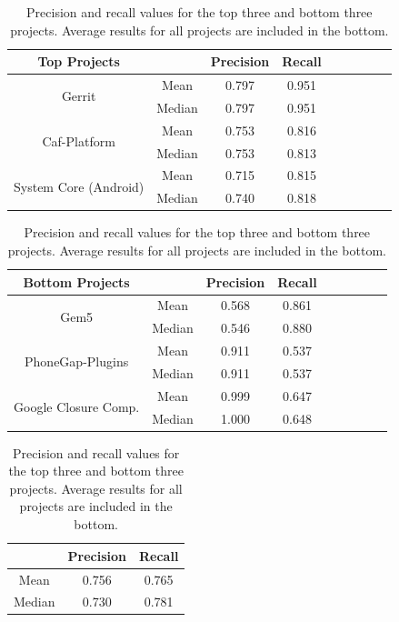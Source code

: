 \documentclass{sig-alternate-05-2015}
\begin{document}
\begin{table}
\centering
\caption{Precision and recall values for the top three and bottom three projects. Average results for all projects are included in the bottom.}
\label{tab:regression}
\begin{tabular}{|c|c|c|c|c|c|c|c|c|} \hline
\textbf{Top Projects}&&\textbf{Precision}&\textbf{Recall}\\ \hline

\multirow{2}{*}{Gerrit}&Mean&0.797&0.951\\ \cline{2-4}
&Median&0.797&0.951\\ \hline
\multirow{2}{*}{Caf-Platform}&Mean&0.753&0.816\\ \cline{2-4}
&Median&0.753&0.813\\ \hline
\multirow{2}{*}{System Core (Android)}&Mean&0.715&0.815\\ \cline{2-4}
&Median&0.740&0.818\\ \hline
\end{tabular}
\newline
\vspace*{0.1 cm}
\newline
\begin{tabular}{|c|c|c|c|c|c|c|c|c|} \hline
\textbf{Bottom Projects}&&\textbf{Precision}&\textbf{Recall}\\ \hline

\multirow{2}{*}{Gem5}&Mean&0.568&0.861\\ \cline{2-4}
&Median&0.546&0.880\\ \hline
\multirow{2}{*}{PhoneGap-Plugins}&Mean&0.911&0.537\\ \cline{2-4}
&Median&0.911&0.537\\ \hline
\multirow{2}{*}{Google Closure Comp. }
&Mean&0.999&0.647\\ \cline{2-4}
&Median&1.000&0.648\\ \hline
\end{tabular}
\newline
\vspace*{0.1 cm}
\newline
\begin{tabular}{|c|c|c|} \hline
&\textbf{Precision}&\textbf{Recall}\\ \hline
Mean&0.756&0.765\\ \hline
Median&0.730&0.781\\ \hline
\end{tabular}
\end{table}
\end{document}
